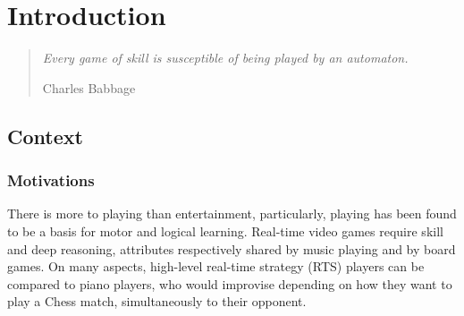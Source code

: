 \chapter{Introduction}

\begin{quotation}
\textit{Every game of skill is susceptible of being played by an automaton.} 
\begin{flushright}Charles Babbage\end{flushright}\end{quotation}



\section{Context}
\subsection{Motivations}



There is more to playing than entertainment, particularly, playing has been found to be a basis for motor and logical learning. Real-time video games require skill and deep reasoning, attributes respectively shared by music playing and by board games. On many aspects, high-level real-time strategy (RTS) players can be compared to piano players, who would improvise depending on how they want to play a Chess match, simultaneously to their opponent. 


